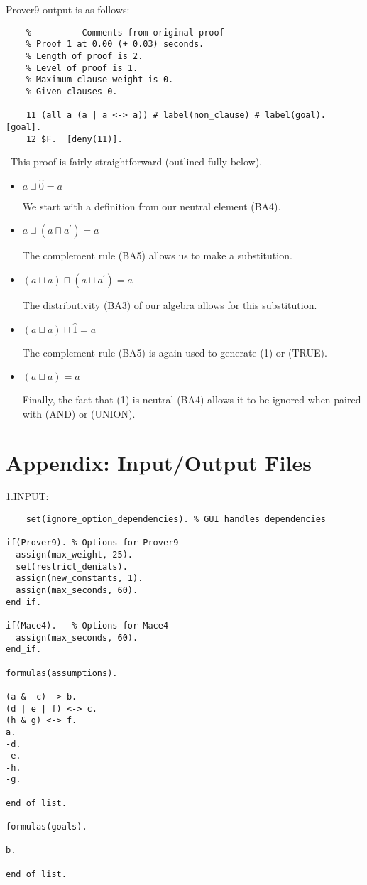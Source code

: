 \documentclass[fullpage]{article}
\begin{document}
Prover9 output is as follows:
 {\footnotesize \begin{verbatim}
	% -------- Comments from original proof --------
	% Proof 1 at 0.00 (+ 0.03) seconds.
	% Length of proof is 2.
	% Level of proof is 1.
	% Maximum clause weight is 0.
	% Given clauses 0.
	
	11 (all a (a | a <-> a)) # label(non_clause) # label(goal).  [goal].
	12 $F.  [deny(11)].
\end{verbatim} }

\noindent
\ This proof is fairly straightforward (outlined fully below).
\begin{itemize}
\item $a \sqcup \hat{0} = a$ 

We start with a definition from our neutral element (BA4).
\item $a \sqcup (a \sqcap a^\prime) = a$

The complement rule (BA5) allows us to make a substitution.
\item $(a \sqcup a) \sqcap (a \sqcup a^\prime) = a$

The distributivity (BA3) of our algebra allows for this substitution.
\item $(a \sqcup a) \sqcap \hat{1} = a$

The complement rule (BA5) is again used to generate (1) or (TRUE).
\item $(a \sqcup a)= a$

Finally, the fact that (1) is neutral (BA4) allows it to be ignored when paired with (AND) or (UNION).
\end{itemize}


\newpage
\section*{Appendix: Input/Output Files}
1.INPUT:

 {\footnotesize \begin{verbatim}
	set(ignore_option_dependencies). % GUI handles dependencies

if(Prover9). % Options for Prover9
  assign(max_weight, 25).
  set(restrict_denials).
  assign(new_constants, 1).
  assign(max_seconds, 60).
end_if.

if(Mace4).   % Options for Mace4
  assign(max_seconds, 60).
end_if.

formulas(assumptions).

(a & -c) -> b.
(d | e | f) <-> c.
(h & g) <-> f.
a.
-d.
-e.
-h.
-g.

end_of_list.

formulas(goals).

b.

end_of_list.
\end{verbatim} }
\end{document}
